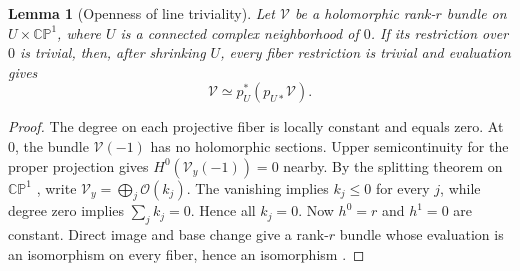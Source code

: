 \documentclass[11pt]{article}
\numberwithin{equation}{section}
\newtheorem{lemma}[theorem]{Lemma}
\theoremstyle{definition}
\theoremstyle{remark}
\newcommand{\CP}{\mathbb{CP}}
\newcommand{\OO}{\mathcal O}
\begin{document}
\begin{lemma}[Openness of line triviality]\label{lem:openness}
Let $\mathcal V$ be a holomorphic rank-$r$ bundle on $U\times\CP^1$, where $U$ is a connected complex neighborhood of $0$. If its restriction over $0$ is trivial, then, after shrinking $U$, every fiber restriction is trivial and evaluation gives
\[
\mathcal V\simeq p_U^*(p_{U*}\mathcal V).
\]
\end{lemma}
\begin{proof}
The degree on each projective fiber is locally constant and equals zero. At $0$, the bundle $\mathcal V(-1)$ has no holomorphic sections. Upper semicontinuity for the proper projection gives $H^0(\mathcal V_y(-1))=0$ nearby. By the splitting theorem on $\CP^1$ \cite{Grothendieck}, write $\mathcal V_y=\bigoplus_j\OO(k_j)$. The vanishing implies $k_j\leq0$ for every $j$, while degree zero implies $\sum_jk_j=0$. Hence all $k_j=0$. Now $h^0=r$ and $h^1=0$ are constant. Direct image and base change give a rank-$r$ bundle whose evaluation is an isomorphism on every fiber, hence an isomorphism \cite{Grauert}.
\end{proof}
\end{document}
